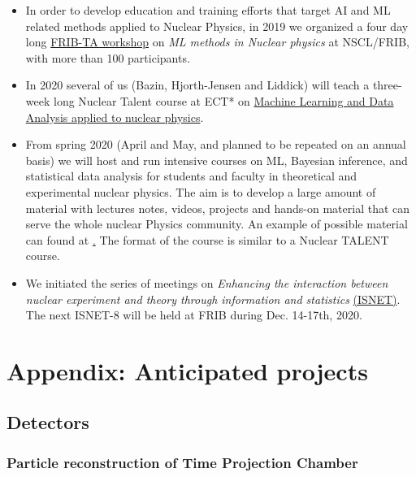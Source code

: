 \documentclass[%
10pt]{article}
\begin{document}
\begin{itemize}

\item In order to develop education and training efforts that target AI and ML related methods applied to Nuclear Physics, in 2019 we  organized a four day long  \href{https://indico.frib.msu.edu/event/16/timetable/?view=standard}{FRIB-TA workshop} on {\it ML methods in Nuclear physics} at  NSCL/FRIB, with more than 100 participants.

\item In 2020 several of us (Bazin, Hjorth-Jensen and Liddick) will teach a three-week long Nuclear Talent course at ECT*  on \href{https://www.ectstar.eu/node/4472}{Machine Learning and Data Analysis applied to nuclear physics}. 


\item From spring 2020 (April and May, and planned to be repeated on an annual basis) we will host and run intensive courses on ML, Bayesian inference, and statistical data analysis for students and faculty in theoretical and experimental nuclear physics. The aim is to develop a large amount of material with lectures notes, videos, projects and hands-on material that can serve the whole nuclear Physics community. An example of possible material can found at \href{https://compphysics.github.io/MachineLearning/doc/web/course.html}.  The format of the course is similar to a Nuclear TALENT course.

\item
We initiated the series of meetings on {\it Enhancing the interaction between nuclear experiment and theory through information and statistics} \href{https://iopscience.iop.org/journal/0954-3899/page/ISNET}{(ISNET)}.  The next ISNET-8 will be held at FRIB during  Dec. 14-17th, 2020.

\end{itemize}

\clearpage
\newpage

\section{Appendix: Anticipated projects}

\subsection{Detectors}
\subsubsection{Particle reconstruction of Time Projection Chamber}
\end{document}
